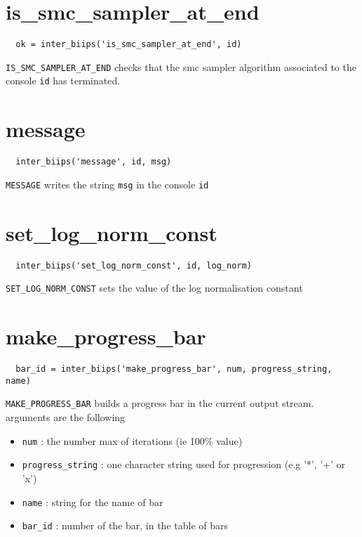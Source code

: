 \documentclass[11pt,twoside]{article}
\begin{document}
\section{is\_smc\_sampler\_at\_end}

 \begin{lstlisting}
  ok = inter_biips('is_smc_sampler_at_end', id)
 \end{lstlisting}
 \texttt{IS\_SMC\_SAMPLER\_AT\_END} checks that the smc sampler algorithm associated to the console \texttt{id} has terminated.


\section{message}

 \begin{lstlisting}
  inter_biips('message', id, msg)
 \end{lstlisting}

  \texttt{MESSAGE} writes the string \texttt{msg} in the console \texttt{id}

\section{set\_log\_norm\_const}

 \begin{lstlisting}
  inter_biips('set_log_norm_const', id, log_norm)
 \end{lstlisting}

  \texttt{SET\_LOG\_NORM\_CONST} sets the value of the log normalisation constant

\section{make\_progress\_bar}

 \begin{lstlisting}
  bar_id = inter_biips('make_progress_bar', num, progress_string, name)
 \end{lstlisting}

 \texttt{MAKE\_PROGRESS\_BAR} builds a progress bar in the current output stream. arguments are the following
 \begin{itemize}
  \item \texttt{num} : the number max of iterations (ie 100\% value)
  \item \texttt{progress\_string} : one character string used for progression (e.g '*', '+' or 'x')
  \item \texttt{name} : string for the name of bar
  \item \texttt{bar\_id} : number of the bar, in the table of bars
  \end{itemize}
\end{document}
